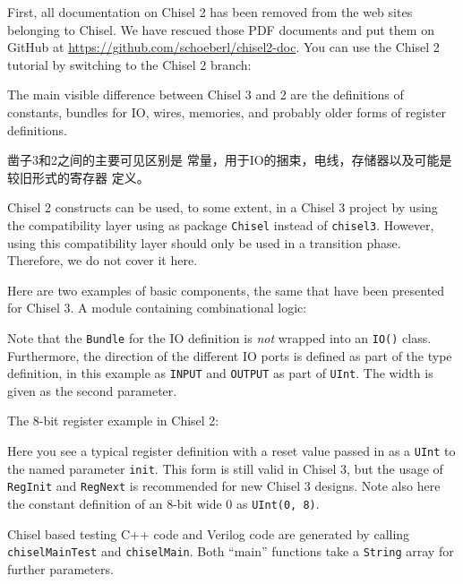 \documentclass[%
    10pt,
    headinclude, footexclude,
    openright, %
    notitlepage,
    cleardoubleempty,
    headsepline,
    pointlessnumbers,
    bibtotoc, idxtotoc,
    ]{scrbook}
\newcommand{\code}[1]{{\small{\texttt{#1}}}}
\begin{document}
{First, all documentation on Chisel 2 has been removed from the web sites
belonging to Chisel. We have rescued those PDF documents and put them
on GitHub at \url{https://github.com/schoeberl/chisel2-doc}.
You can use the Chisel 2 tutorial by switching to the Chisel 2 branch:


The main visible difference between Chisel 3 and 2 are the definitions of
constants, bundles for IO, wires, memories, and probably older forms of register
definitions.


凿子3和2之间的主要可见区别是
常量，用于IO的捆束，电线，存储器以及可能是较旧形式的寄存器
定义。

Chisel 2 constructs can be used, to some extent, in a Chisel 3 project by
using the compatibility layer using as package \code{Chisel} instead of \code{chisel3}.
However, using this compatibility layer should only be used in a transition phase.
Therefore, we do not cover it here.

Here are two examples of basic components, the same that have been presented
for Chisel 3. A module containing combinational logic:


Note that the \code{Bundle} for the IO definition is \emph{not} wrapped into
an \code{IO()} class.  Furthermore, the direction of the different IO ports is defined
as part of the type definition, in this example as \code{INPUT} and \code{OUTPUT}
as part of \code{UInt}. The width is given as the second parameter.

\begin{minipage}{\linewidth}
The 8-bit register example in Chisel 2:

\end{minipage}

Here you see a typical register definition with a reset value passed in as
a \code{UInt} to the named parameter \code{init}. This form is still valid in Chisel 3,
but the usage of \code{RegInit} and \code{RegNext} is recommended for new Chisel 3 designs.
Note also here the constant definition of an 8-bit wide 0 as \code{UInt(0, 8)}.

Chisel based testing C++ code and Verilog code are generated by calling \code{chiselMainTest}
and \code{chiselMain}. Both ``main'' functions take a \code{String} array for further parameters.

}
\end{document}
